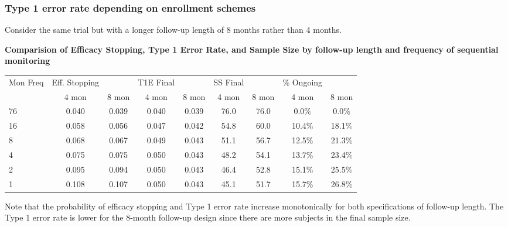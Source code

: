 \documentclass[12pt]{article}
\begin{document}
\newpage
\subsubsection{Type 1 error rate depending on enrollment schemes}
Consider the same trial but with a longer follow-up length of 8 months rather than 4 months. 
\begin{center}
\textbf{Comparision of Efficacy Stopping, Type 1 Error Rate, and Sample Size by follow-up length and frequency of sequential monitoring}
\begin{tabular}{l | cccccccc}
Mon Freq  & Eff. Stopping	&		&	T1E Final	&		&	SS Final	&		&	\% Ongoing	&\\
	&	4 mon	&	8 mon	&	4 mon	&	8 mon	&	4 mon	&	8 mon	&	4 mon	&	8 mon	\\
\hline
76	&	0.040	&	0.039	&	0.040	&	0.039	&	76.0	&	76.0	&	0.0\%	&	0.0\%	\\
16	&	0.058	&	0.056	&	0.047	&	0.042	&	54.8	&	60.0	&	10.4\%	&	18.1\%	\\
8	&	0.068	&	0.067	&	0.049	&	0.043	&	51.1	&	56.7	&	12.5\%	&	21.3\%	\\
4	&	0.075	&	0.075	&	0.050	&	0.043	&	48.2	&	54.1	&	13.7\%	&	23.4\%	\\
2	&	0.095	&	0.094	&	0.050	&	0.043	&	46.4	&	52.8	&	15.1\%	&	25.5\%	\\
1	&	0.108	&	0.107	&	0.050	&	0.043	&	45.1	&	51.7	&	15.7\%	&	26.8\%	
\end{tabular}
\end{center}
Note that the probability of efficacy stopping and Type 1 error rate increase monotonically for both specifications of follow-up length. The Type 1 error rate is lower for the 8-month follow-up design since there are more subjects in the final sample size.


\newpage
\end{document}

